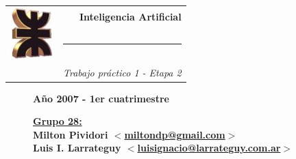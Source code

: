 \thispagestyle{empty}

\begin{center}
\begin{tabular}{cr}
\multirow{3}{*}{ \includegraphics{logoUTN.jpg} }
& \Huge\bfseries Inteligencia Artificial \\
& \noindent\rule[-1ex]{120mm}{4pt} \\
& \\
& \noindent\large\emph{Trabajo práctico 1 - Etapa 2}
\end{tabular}
\end{center}

\begin{figure}[b]
\center\large\textbf{Año 2007 - 1er cuatrimestre}
\normalsize
\linebreak
\begin{flushleft}
\bfseries
\underline{Grupo 28:}\\
Milton Pividori \href{mailto:miltondp@gmail.com}
  {$<$miltondp@gmail.com$>$}\\
Luis I. Larrateguy \href{mailto:luisignacio@larrateguy.com.ar}
  {$<$luisignacio@larrateguy.com.ar$>$}
\end{flushleft}

\end{figure}
